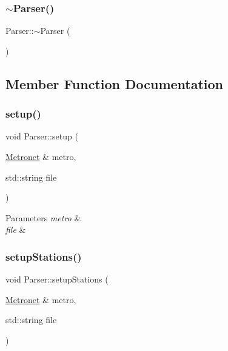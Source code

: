 \mbox{\label{class_parser_a3e658b5917a93a3ef648050d060e3a93}} 
\subsubsection{\texorpdfstring{$\sim$\+Parser()}{~Parser()}}
{\footnotesize\ttfamily Parser\+::$\sim$\+Parser (\begin{DoxyParamCaption}{ }\end{DoxyParamCaption})\hspace{0.3cm}{\ttfamily [virtual]}}



\subsection{Member Function Documentation}
\mbox{\label{class_parser_a5fc136436324d779fc2cd55825b381cb}} 
\subsubsection{\texorpdfstring{setup()}{setup()}}
{\footnotesize\ttfamily void Parser\+::setup (\begin{DoxyParamCaption}\item[{\hyperlink{class_metronet}{Metronet} \&}]{metro,  }\item[{std\+::string}]{file }\end{DoxyParamCaption})}


\begin{DoxyParams}{Parameters}
{\em metro} & \\
\hline
{\em file} & \\
\hline
\end{DoxyParams}
\mbox{\label{class_parser_a9aa0d57be0166c22c74d2b9a7e5272cb}} 
\subsubsection{\texorpdfstring{setup\+Stations()}{setupStations()}}
{\footnotesize\ttfamily void Parser\+::setup\+Stations (\begin{DoxyParamCaption}\item[{\hyperlink{class_metronet}{Metronet} \&}]{metro,  }\item[{std\+::string}]{file }\end{DoxyParamCaption})}



